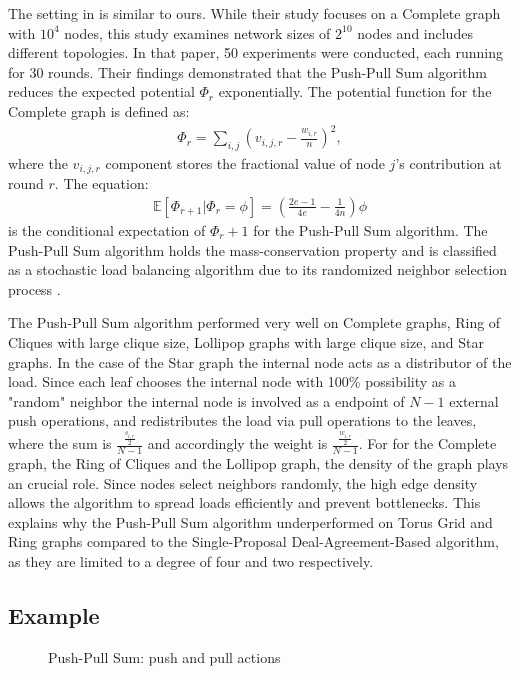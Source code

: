 

The setting in \cite{nugroho2023PushPullSumDataAg} is similar to ours. While their study focuses on a Complete graph with $10^{4}$ nodes, this study examines network sizes of $2^{10}$ nodes and includes different topologies. In that paper, 50 experiments were conducted, each running for 30 rounds. Their findings demonstrated that the Push-Pull Sum algorithm reduces the expected potential $\Phi_r$ exponentially. The potential function for the Complete graph is defined as:
\begin{align}
    \Phi_r=\sum_{i,j}\left(v_{i,j,r}-\frac{w_{i,r}}{n}\right)^{2},  
\end{align} where the $v_{i,j,r}$ component stores the fractional value of node $j$'s contribution at round $r$. The equation: 
\begin{align}
    \mathbb{E}[\Phi_{r+1}|\Phi_r=\phi]=(\frac{2e-1}{4e}-\frac{1}{4n})\phi    
\end{align}
is the conditional expectation of $\Phi_r+1$ for the Push-Pull Sum algorithm. The Push-Pull Sum algorithm holds the mass-conservation property and is classified as a stochastic load balancing algorithm due to its randomized neighbor selection process \cite{nugroho2023PushPullSumDataAg}.

The Push-Pull Sum algorithm performed very well on Complete graphs, Ring of Cliques with large clique size, Lollipop graphs with large clique size, and Star graphs. In the case of the Star graph the internal node acts as a distributor of the load. Since each leaf chooses the internal node with 100\% possibility as a "random" neighbor the internal node is involved as a endpoint of $N-1$ external push operations, and redistributes the load via pull operations to the leaves, where the sum is $\frac{\frac{s_{i,r}}{2}}{N-1}$ and accordingly the weight is $\frac{\frac{w_{i,r}}{2}}{N-1}$. For for the Complete graph, the Ring of Cliques and the Lollipop graph, the density of the graph plays an crucial role. Since nodes select neighbors randomly, the high edge density allows the algorithm to spread loads efficiently and prevent bottlenecks. This explains why the Push-Pull Sum algorithm underperformed on Torus Grid and Ring graphs compared to the Single-Proposal Deal-Agreement-Based algorithm, as they are limited to a degree of four and two respectively.

\subsection{Example}\label{subsec:examplePPS}
\begin{figure}
    \centering
    \scalebox{0.75}{}
    \caption{Push-Pull Sum: push and pull actions}
    \label{fig:examplePPSSetting}
\end{figure}

